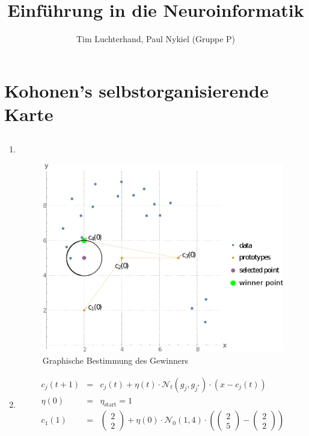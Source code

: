 \documentclass[DIN, pagenumber=false, fontsize=11pt, parskip=half]{scrartcl}
\title{Einführung in die Neuroinformatik}
\author{Tim Luchterhand, Paul Nykiel (Gruppe P)}
\begin{document}
    \maketitle
    \section{Kohonen's selbstorganisierende Karte}
    \subsection{}
    \begin{enumerate}[label=(\alph*)]
        \item $ $
            \begin{figure}[H]
                \centering
                \includegraphics[width=.9\textwidth]{winner}
                \caption{Graphische Bestimmung des Gewinners}
            \end{figure}
        \item
            \begin{eqnarray*}
                c_j (t + 1) &=& c_j(t) + \eta(t) \cdot  \mathcal{N}_t (g_j , g_{j^{*}}) \cdot (x - c_j(t)) \\
                \eta(0) &=& \eta_\text{start} = 1 \\
                c_1 (1) &=& \begin{pmatrix} 2 \\ 2 \end{pmatrix} + \eta(0) \cdot \mathcal{N}_0 (1, 4) \cdot \left(\begin{pmatrix} 2 \\ 5\end{pmatrix} - \begin{pmatrix} 2 \\ 2 \end{pmatrix}\right) \\

\end{eqnarray*}
\end{enumerate}
\end{document}
